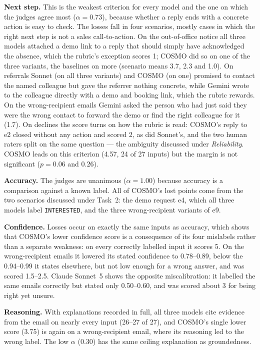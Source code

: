 \documentclass[a4paper]{article}
\begin{document}
\textbf{Next step.} This is the weakest criterion for every model and the one
on which the judges agree most ($\alpha=0.73$), because whether a reply ends
with a concrete action is easy to check. The losses fall in four scenarios, mostly
cases in which the right next step is not a sales call-to-action. On
the out-of-office notice all three models attached a demo link to a reply that
should simply have acknowledged the absence, which the rubric's exception
scores 1; COSMO did so on one of the three variants, the baselines on more
(scenario means 3.7, 2.3 and 1.0). On referrals Sonnet (on all three variants) and COSMO (on one)
promised to contact the named colleague but gave the referrer nothing concrete,
while Gemini
wrote to the colleague directly with a demo and booking link, which the rubric
rewards. On the wrong-recipient emails Gemini asked the person who had just
said they were the wrong contact to forward the demo or find the right colleague
for it (1.7). On declines the score turns on how the rubric is read: COSMO's
reply to e2 closed without any action and scored 2, as did Sonnet's, and the two
human raters split on the same question --- the ambiguity discussed under
\emph{Reliability}. COSMO leads on this criterion
(4.57, 24 of 27 inputs) but the margin is not significant ($p=0.06$ and
$0.26$).

\textbf{Accuracy.} The judges are unanimous ($\alpha=1.00$) because accuracy is
a comparison against a known label. All of COSMO's lost points come from the
two scenarios discussed under Task~2: the demo request e4, which all three
models label \texttt{INTERESTED}, and the three wrong-recipient variants of e9.

\textbf{Confidence.} Losses occur on exactly the same inputs as accuracy, which
shows that COSMO's lower confidence score is a consequence of its four
mislabels rather than a separate weakness: on every correctly labelled input it
scores 5. On the wrong-recipient emails it lowered its stated confidence to
0.78--0.89, below the 0.94--0.99 it states elsewhere, but not low enough for a
wrong answer, and was scored 1.5--2.5. Claude Sonnet~5 shows the opposite
miscalibration: it labelled the same emails correctly but stated only
0.50--0.60, and was scored about 3 for being right yet unsure.

\textbf{Reasoning.} With explanations recorded in full, all three models cite
evidence from the email on nearly every input (26--27 of 27), and COSMO's single
lower score (3.75) is again on a wrong-recipient email, where its reasoning led
to the wrong label. The low $\alpha$ (0.30) has the same ceiling explanation as
groundedness.
\end{document}
